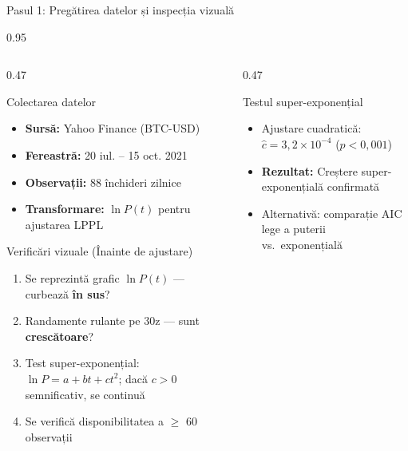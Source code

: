 \documentclass[9pt, aspectratio=169, t]{beamer}
\begin{document}
\begin{frame}{Pasul 1: Pregătirea datelor și inspecția vizuală}
    \begin{cminipage}{0.95\textwidth}
    {\footnotesize
    \begin{columns}[T]
        \begin{column}{0.47\textwidth}
            \begin{block}{Colectarea datelor}
                \begin{itemize}\setlength{\itemsep}{0pt}
                    \item \textbf{Sursă:} Yahoo Finance (BTC-USD)
                    \item \textbf{Fereastră:} 20 iul. -- 15 oct. 2021
                    \item \textbf{Observații:} 88 închideri zilnice
                    \item \textbf{Transformare:} $\ln P(t)$ pentru ajustarea LPPL
                \end{itemize}
            \end{block}

            \begin{exampleblock}{Verificări vizuale (Înainte de ajustare)}
                \begin{enumerate}\setlength{\itemsep}{0pt}
                    \item Se reprezintă grafic $\ln P(t)$ --- curbează \textbf{în sus}?
                    \item Randamente rulante pe 30z --- sunt \textbf{crescătoare}?
                    \item Test super-exponențial: $\ln P = a + bt + ct^2$; dacă $c > 0$ semnificativ, se continuă
                    \item Se verifică disponibilitatea a $\geq$ 60 observații
                \end{enumerate}
            \end{exampleblock}
        \end{column}
        \begin{column}{0.47\textwidth}
            \begin{alertblock}{Testul super-exponențial}
                \begin{itemize}\setlength{\itemsep}{0pt}
                    \item Ajustare cuadratică: $\hat{c} = 3{,}2 \times 10^{-4}$ ($p < 0{,}001$)
                    \item \textbf{Rezultat:} Creștere super-exponențială confirmată
                    \item Alternativă: comparație AIC lege a puterii vs.\ exponențială
                \end{itemize}
            \end{alertblock}


\end{column}
\end{columns}}
\end{cminipage}
\end{frame}
\end{document}
